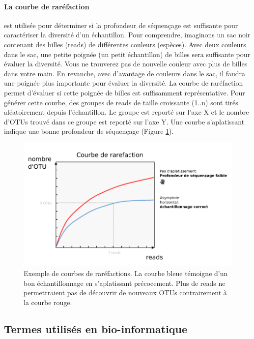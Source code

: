 \documentclass[12pt,a4paper]{article}
\begin{document}
\paragraph{La courbe de raréfaction} est utilisée pour déterminer si la profondeur de séquençage est suffisante pour caractériser la diversité d’un échantillon. Pour comprendre, imaginons un sac noir contenant des billes (reads) de différentes couleurs (espèces). Avec deux couleurs dans le sac, une petite poignée (un petit échantillon) de billes sera suffisante pour évaluer la diversité. Vous ne trouverez pas de nouvelle couleur avec plus de billes dans votre main. En revanche, avec d'avantage de couleurs dans le sac, il faudra une poignée plus importante pour évaluer la diversité. La courbe de raréfaction permet d'évaluer si cette poignée de billes est suffisamment représentative.
Pour générer cette courbe, des groupes de reads de taille croissante (1..n) sont tirés aléatoirement depuis l'échantillon. Le groupe est reporté sur l'axe X et le nombre d'OTUs trouvé dans ce groupe est reporté sur l’axe Y.
Une courbe s’aplatissant indique une bonne profondeur de séquençage (Figure \ref{rarefaction_demo}).


\begin{figure}[ht]
\begin{center}
\includegraphics[scale=0.5]{img/rarefaction_example.png}\hfill
\end{center}
\caption{Exemple de courbes de raréfactions. La courbe bleue témoigne d'un bon échantillonnage en s’aplatissant précocement. Plus de reads ne permettraient pas de découvrir de nouveaux OTUs contrairement à la courbe rouge. }
\label{rarefaction_demo}
\end{figure}

\subsection{Termes utilisés en bio-informatique}
\end{document}
